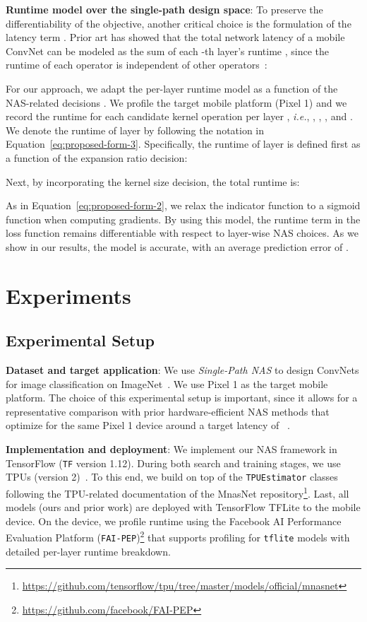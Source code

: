 \documentclass[runningheads]{llncs}
\begin{document}
\textbf{Runtime model over the single-path design space}: To preserve the
differentiability of the objective, another critical choice is the formulation of
the latency term . Prior art has showed that the total network latency of a 
mobile ConvNet can be modeled as the sum of each -th layer's 
runtime , since the runtime of each operator
is independent of other operators~\cite{cai2017neuralpower,cai2018proxylessnas,wu2018fbnet}:


For our approach, we adapt the per-layer runtime model as a function of the 
NAS-related decisions .
We profile the target mobile platform (Pixel 1)
and we record the runtime for each candidate kernel operation per layer , 
\textit{i.e.}, , , ,
and . We denote the runtime of layer  by following the notation 
in Equation~\ref{eq:proposed-form-3}. Specifically, 
the runtime of layer  is defined first as a
function of the expansion ratio decision:

Next, by incorporating the kernel size decision, the total runtime is:

As in Equation~\ref{eq:proposed-form-2}, we relax the indicator 
function to a sigmoid function  when computing gradients.
By using this model, the runtime term in the loss function remains 
differentiable with respect to layer-wise NAS choices.
As we show in our results, the model is accurate, with an average 
prediction error of .


\section{Experiments}
\label{sec:results}

\subsection{Experimental Setup}

\textbf{Dataset and target application}:
We use \textit{Single-Path NAS} to design ConvNets for image classification 
on ImageNet~\cite{deng2009imagenet}. We use Pixel 1 as the target 
mobile platform. The choice of this experimental setup is important,
since it allows for a representative comparison with prior 
hardware-efficient NAS methods that optimize for the same
Pixel 1 device around a target latency of 
~\cite{cai2018proxylessnas,tan2018mnasnet}.

\textbf{Implementation and deployment}: We implement our NAS 
framework in TensorFlow (\texttt{TF} version 1.12).
During both search and training stages, we use TPUs 
(version 2)~\cite{jouppi2017datacenter}. To this end,  
we build on top of the \texttt{TPUEstimator} classes following the 
TPU-related documentation of the MnasNet 
repository\footnote{\url{https://github.com/tensorflow/tpu/tree/master/models/official/mnasnet}}. 
Last, all models (ours and prior work) are deployed with 
TensorFlow TFLite to the mobile device. On the device, we profile 
runtime using the Facebook AI Performance Evaluation 
Platform (\texttt{FAI-PEP})\footnote{\url{https://github.com/facebook/FAI-PEP}}
that supports profiling for \texttt{tflite} models with detailed 
per-layer runtime breakdown.
\end{document}
